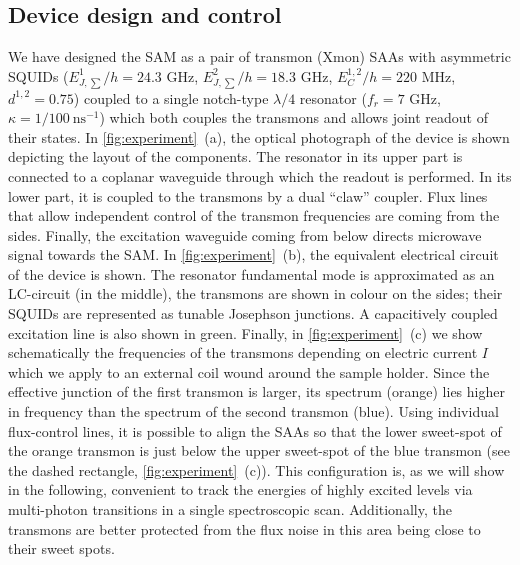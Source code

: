 \documentclass[%
 pra,
 amsmath,amssymb,
 reprint,%
]{revtex4-1}
\begin{document}
\subsection{Device design and control}
We have designed the SAM as a pair of transmon 
(Xmon) SAAs with asymmetric 
SQUIDs\cite{hutchings2017tunable} ($E^1_{J, 
\sum}/h = 24.3$ GHz, $E^2_{J,\sum}/h = 18.3$ GHz, 
$E^{1,2}_C/h = 220$ MHz, $d^{1,2} =0.75$) coupled 
to a single notch-type\cite{probst2015efficient} 
$\lambda/4$ resonator ($f_r = 7$ GHz, $\kappa = 
1/100\ \text{ns}^{-1}$) which both 
couples\cite{majer2007coupling} the transmons and 
allows joint\cite{chow2010detecting} readout of 
their states. In \autoref{fig:experiment}~(a), 
the optical photograph of the device is shown 
depicting the layout of the components. The 
resonator in its upper part is connected to a 
coplanar waveguide through which the readout is 
performed. In its lower part, it is coupled to 
the transmons by a dual 
``claw''\cite{barends2013coherent} coupler. Flux 
lines that allow independent control of the 
transmon frequencies are coming from the sides. 
Finally, the excitation waveguide coming from 
below directs microwave signal towards the SAM. 
In \autoref{fig:experiment}~(b), the equivalent 
electrical circuit of the device is shown. The 
resonator fundamental mode is approximated as an 
LC-circuit (in the middle), the transmons are 
shown in colour on the sides; their SQUIDs are 
represented as tunable Josephson junctions. A 
capacitively coupled excitation line is also 
shown in green. Finally, in 
\autoref{fig:experiment}~(c) we show 
schematically the frequencies of the transmons 
depending on electric current $I$ which we apply 
to an external coil wound around the sample 
holder. Since the effective junction of the first 
transmon is larger, its spectrum (orange) lies 
higher in frequency than the spectrum of the 
second transmon (blue). Using individual 
flux-control lines, it is possible to align the 
SAAs so that the lower sweet-spot of the orange 
transmon is just below the upper sweet-spot of 
the blue transmon (see the dashed rectangle,  
\autoref{fig:experiment}~(c)). This configuration 
is, as we will show in the following, convenient 
to track the energies of highly excited levels 
via multi-photon transitions in a single 
spectroscopic scan. Additionally, the transmons 
are better protected from the flux noise in this 
area being close to their sweet spots.
\end{document}
